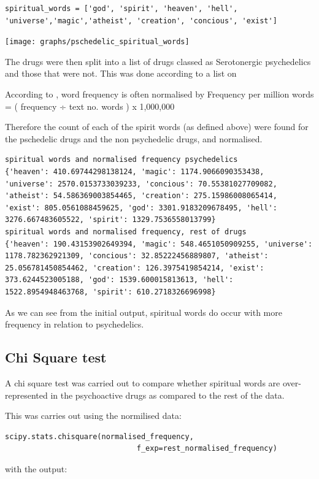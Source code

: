 \documentclass{article}
\begin{document}
\begin{lstlisting}
spiritual_words = ['god', 'spirit', 'heaven', 'hell', 'universe','magic','atheist', 'creation', 'concious', 'exist']
\end{lstlisting}

\texttt{[image: graphs/pschedelic\_spiritual\_words]}

The drugs were then split into a list of drugs classed as Serotonergic psychedelics and those that were not. This was done according to a list on \cite{wiki}

According to \cite{Lancaster}, word frequency is often normalised by Frequency per million words = ( frequency ÷ text no. words ) x 1,000,000 

Therefore the count of each of the spirit words (as defined above) were found for the pschedelic drugs and the non psychedelic drugs, and normalised. 

\begin{lstlisting}
spiritual words and normalised frequency psychedelics
{'heaven': 410.69744298138124, 'magic': 1174.9066090353438, 'universe': 2570.0153733039233, 'concious': 70.55381027709082, 'atheist': 54.586369003854465, 'creation': 275.15986008065414, 'exist': 805.0561088459625, 'god': 3301.9183209678495, 'hell': 3276.667483605522, 'spirit': 1329.7536558013799}
spiritual words and normalised frequency, rest of drugs
{'heaven': 190.43153902649394, 'magic': 548.4651050909255, 'universe': 1178.782362921309, 'concious': 32.85222456889807, 'atheist': 25.056781450854462, 'creation': 126.3975419854214, 'exist': 373.6244523005188, 'god': 1539.600015813613, 'hell': 1522.8954948463768, 'spirit': 610.2718326696998}
\end{lstlisting}

As we can see from the initial output, spiritual words do occur with more frequency in relation to psychedelics.

\subsection{Chi Square test}

A chi square test was carried out to compare whether spiritual words are over-represented in the psychoactive drugs as compared to the rest of the data. 

This was carries out using the normilised data:

\begin{lstlisting}
scipy.stats.chisquare(normalised_frequency,
                              f_exp=rest_normalised_frequency)
\end{lstlisting}
with the output:
\end{document}
